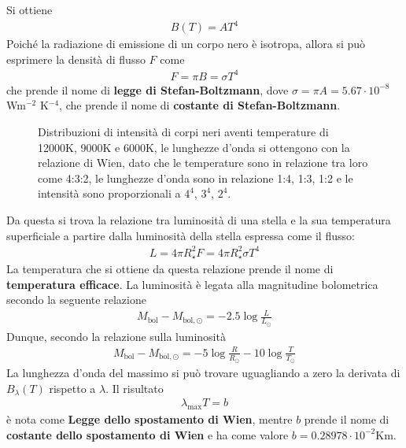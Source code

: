 \documentclass[a4paper, oneside]{book}
\begin{document}
Si ottiene 
\begin{align}
    B(T) = AT^{4}
\end{align}
Poiché la radiazione di emissione di un corpo nero è isotropa, allora si può esprimere la densità di flusso $F$ come
\begin{align}
    F = \pi B = \sigma T^{4}
\end{align}
che prende il nome di \textbf{legge di Stefan-Boltzmann}, dove
$\sigma = \pi A = 5.67 \cdot 10^{-8}$ Wm$^{-2}$ K$^{-4}$, che prende il nome di \textbf{costante di Stefan-Boltzmann}.
\begin{figure}[H]
    \centering
    \caption{Distribuzioni di intensità di corpi neri aventi temperature di 12000K, 9000K e 6000K,
    le lunghezze d'onda si ottengono con la relazione di Wien, dato che le temperature sono in relazione
    tra loro come 4:3:2, le lunghezze d'onda sono in relazione 1:4, 1:3, 1:2 e le intensità sono 
    proporzionali a $4^{4}$, $3^{4}$, $2^{4}$.}
   
\end{figure}
Da questa si trova la relazione tra luminosità di una stella e la sua temperatura superficiale
a partire dalla luminosità della stella espressa come il flusso:
\begin{align}
    L = 4\pi R_\star^{2}F = 4\pi R_\star^{2}\sigma T^{4}
\end{align}
La temperatura che si ottiene da questa relazione prende il nome di
\textbf{temperatura efficace}. La luminosità è legata alla magnitudine bolometrica
secondo la seguente relazione
\begin{gather*}
    M_{\text{bol}} - M_{\text{bol}, \odot} = - 2.5 \log \frac{L}{L_\odot} 
\end{gather*}
Dunque, secondo la relazione sulla luminosità
\begin{align}
    M_{\text{bol}} - M_{\text{bol}, \odot} = -5\log\frac{R}{R_\odot} - 10 \log \frac{T}{T_\odot}
\end{align}
La lunghezza d'onda del massimo si può trovare uguagliando a zero la derivata di
$B_\lambda(T)$ rispetto a $\lambda$. Il risultato 
\begin{align}
    \lambda_{\text{max}} T = b
\end{align}
è nota come \textbf{Legge dello spostamento di Wien}, mentre $b$ prende il nome di
\textbf{costante dello spostamento di Wien} e ha come valore $b = 0.28978 \cdot 10^{-2}$Km.
\end{document}
